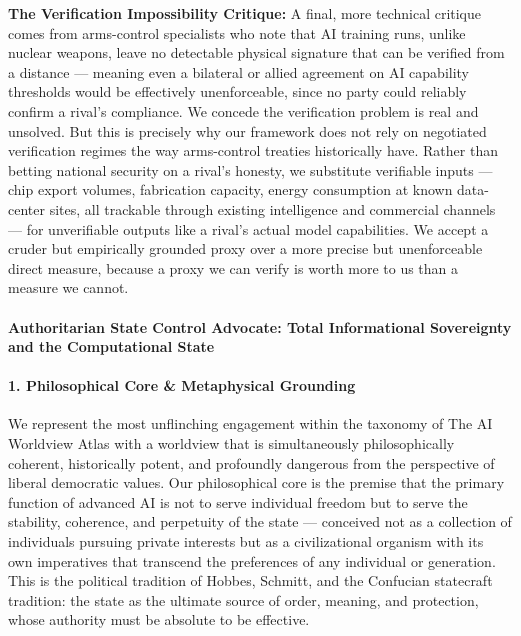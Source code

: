 \textbf{The Verification Impossibility Critique:} A final, more
technical critique comes from arms-control specialists who note that AI
training runs, unlike nuclear weapons, leave no detectable physical
signature that can be verified from a distance --- meaning even a
bilateral or allied agreement on AI capability thresholds would be
effectively unenforceable, since no party could reliably confirm a
rival's compliance. We concede the verification problem is real and
unsolved. But this is precisely why our framework does not rely on
negotiated verification regimes the way arms-control treaties
historically have. Rather than betting national security on a rival's
honesty, we substitute verifiable inputs --- chip export volumes,
fabrication capacity, energy consumption at known data-center sites, all
trackable through existing intelligence and commercial channels --- for
unverifiable outputs like a rival's actual model capabilities. We accept
a cruder but empirically grounded proxy over a more precise but
unenforceable direct measure, because a proxy we can verify is worth
more to us than a measure we cannot.

\paragraph{Authoritarian State Control Advocate: Total Informational
Sovereignty and the Computational
State}\label{authoritarian-state-control-advocate-total-informational-sovereignty-and-the-computational-state}

\paragraph{1. Philosophical Core \& Metaphysical
Grounding}\label{philosophical-core-metaphysical-grounding-22}

We represent the most unflinching engagement within the taxonomy of The
AI Worldview Atlas with a worldview that is simultaneously
philosophically coherent, historically potent, and profoundly dangerous
from the perspective of liberal democratic values. Our philosophical
core is the premise that the primary function of advanced AI is not to
serve individual freedom but to serve the stability, coherence, and
perpetuity of the state --- conceived not as a collection of individuals
pursuing private interests but as a civilizational organism with its own
imperatives that transcend the preferences of any individual or
generation. This is the political tradition of Hobbes, Schmitt, and the
Confucian statecraft tradition: the state as the ultimate source of
order, meaning, and protection, whose authority must be absolute to be
effective.

